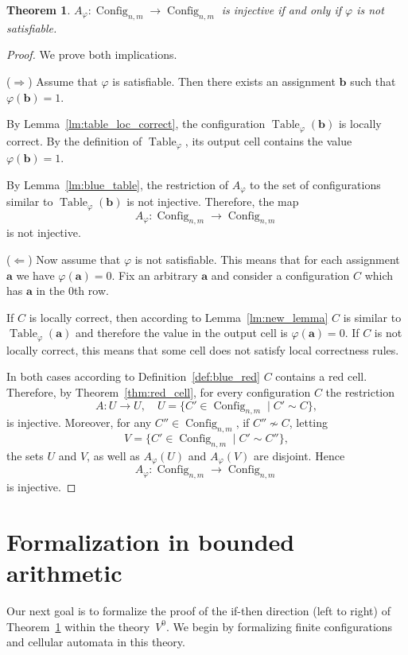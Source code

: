 \documentclass{article}
\theoremstyle{plain}
\newtheorem{theorem}{Theorem}[section]
\theoremstyle{definition}
\DeclareMathOperator{\Config}{Config}
\DeclareMathOperator{\Table}{Table}
\newcommand{\tuple}{\mathbf}
\begin{document}
\begin{theorem}\label{thm:injective_not_sat}
     $A_\varphi: \Config_{n,m} \to \Config_{n,m}$ is injective if and only if $\varphi$ is not satisfiable. 
\end{theorem}
\begin{proof}
We prove both implications.

($\Rightarrow$) Assume that $\varphi$ is satisfiable. Then there exists an assignment $\tuple b$ such that $\varphi(\tuple b)=1$.

By Lemma~\ref{lm:table_loc_correct}, the configuration $\Table_\varphi(\tuple b)$ is locally correct. By the definition of $\Table_\varphi$, its output cell contains the value $\varphi(\tuple b)=1$.

By Lemma~\ref{lm:blue_table}, the restriction of $A_\varphi$ to the set of configurations similar to $\Table_\varphi(\tuple b)$ is not injective. Therefore, the map
\[
A_\varphi : \Config_{n,m} \to \Config_{n,m}
\]
is not injective.


($\Leftarrow$) Now assume that $\varphi$ is not satisfiable. This means that for each assignment $\tuple a$ we have $\varphi(\tuple a) = 0$. Fix an arbitrary
$\tuple{a}$ and consider a configuration $C$ which has $\tuple a$ in the $0$th row. 

If $C$ is locally correct, then according to Lemma~\ref{lm:new_lemma} $C$ is similar to $\Table_\varphi(\tuple a)$ and therefore the value in the output cell is $\varphi(\tuple a) = 0$. If $C$ is not locally correct, this means that some cell does not satisfy local correctness rules.

In both cases according to Definition~\ref{def:blue_red} $C$ contains a red cell.  Therefore, by
Theorem~\ref{thm:red_cell}, for every configuration $C$ the restriction
\[
A: U \to U,
\quad
U = \{C' \in \Config_{n,m} \mid C' \sim C\},
\]
is injective. Moreover, for any $C'' \in \Config_{n,m}$, if $C'' \not\sim C$, letting
\[
V = \{C' \in \Config_{n,m} \mid C' \sim C''\},
\]
the sets $U$ and $V$, as well as $A_\varphi(U)$ and $A_\varphi(V)$ are disjoint. Hence
\[
A_\varphi : \Config_{n,m} \to \Config_{n,m}
\]
is injective.
\end{proof}




\section{Formalization in bounded arithmetic}
Our next goal is to formalize the proof of the if-then direction (left to right) of Theorem~\ref{thm:injective_not_sat} within the theory~$V^0$. We begin by formalizing finite configurations and cellular automata in this theory.
\end{document}
